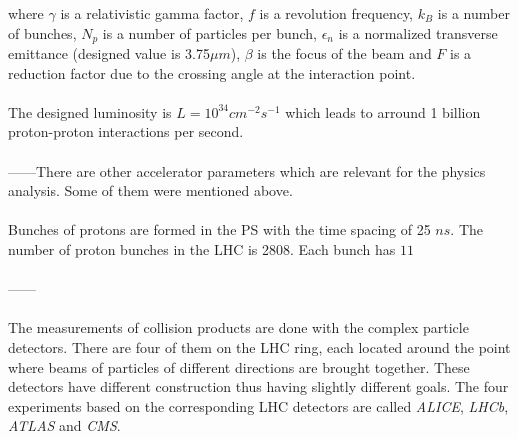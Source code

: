 where $\gamma$ is a relativistic gamma factor, $f$ is a revolution frequency, $k_{B}$ is a number of bunches,
$N_{p}$ is a number of particles per bunch, $\epsilon_{n}$ is a normalized transverse emittance (designed value
is 3.75$\mu m$), $\beta$ is the focus of the beam and $F$ is a reduction factor due to the crossing angle at the 
interaction point.
\\
\\
The designed luminosity is $L = 10^{34} cm^{-2}s^{-1}$ which leads to arround 1 billion proton-proton 
interactions per second.
\\
\\
------There are other accelerator parameters which are relevant for the physics analysis. Some of them were
mentioned above.
\\
\\
Bunches of protons are formed in the PS with the time spacing of 25 $ns$. The number of proton bunches in the LHC is
2808. Each bunch has $11 $
\\
\\
------
\\
\\
The measurements of collision products are done with the complex particle detectors. There are four of them on the LHC
ring, each located around the point where beams of particles of different directions are brought together.
These detectors have different construction thus having slightly different goals.
The four experiments based on the corresponding LHC detectors are called \textit{ALICE}, \textit{LHCb}, \textit{ATLAS}
and \textit{CMS}.

